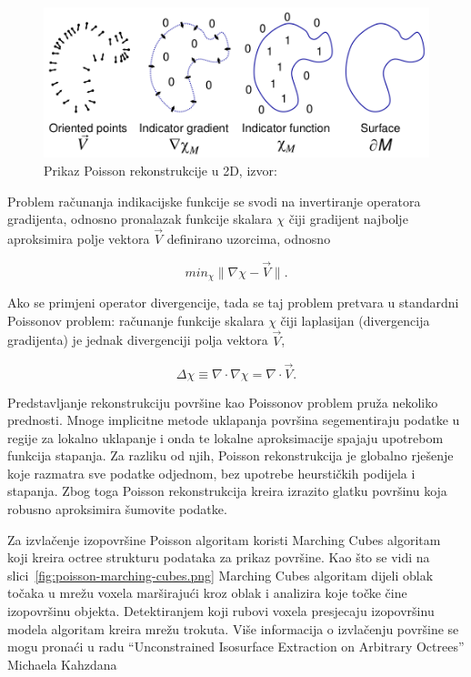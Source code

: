 \begin{figure}[h]
\centering
\includegraphics[scale=0.35]{figures/poisson-reconstruction.png}
\caption[]{Prikaz Poisson rekonstrukcije u 2D,
    izvor:~\cite{Kazhdan:2006}}
\label{fig:poisson-reconstruction.png}
\end{figure}

Problem računanja indikacijske funkcije se svodi na invertiranje
operatora gradijenta, odnosno pronalazak funkcije skalara \(\chi\) čiji
gradijent najbolje aproksimira polje vektora \(\vec{V}\) definirano
uzorcima, odnosno 

\begin{equation*}
min_\chi \|\nabla\chi - \vec{V}\|.
\end{equation*}

Ako se primjeni operator divergencije, tada se taj problem pretvara u
standardni Poissonov problem: računanje funkcije skalara \(\chi\) čiji
laplasijan (divergencija gradijenta) je jednak divergenciji polja
vektora \(\vec{V}\),

\begin{equation*}
\Delta \chi \equiv \nabla \cdot \nabla\chi = \nabla \cdot \vec{V}.
\end{equation*}

Predstavljanje rekonstrukciju površine kao Poissonov problem pruža
nekoliko prednosti. Mnoge implicitne metode uklapanja površina
segementiraju podatke u regije za lokalno uklapanje i onda te lokalne
aproksimacije spajaju upotrebom funkcija stapanja. Za razliku od njih,
Poisson rekonstrukcija je globalno rješenje koje razmatra sve podatke
odjednom, bez upotrebe heurstičkih podijela i stapanja. Zbog toga
Poisson rekonstrukcija kreira izrazito glatku površinu koja robusno
aproksimira šumovite podatke.  

Za izvlačenje izopovršine Poisson algoritam koristi Marching Cubes
algoritam~\cite{Lorensen87marchingcubes} koji kreira octree strukturu
podataka za prikaz površine.  Kao što se vidi na
slici~\ref{fig:poisson-marching-cubes.png} Marching Cubes algoritam
dijeli oblak točaka u mrežu voxela marširajući kroz oblak i analizira
koje točke čine izopovršinu objekta.  Detektiranjem koji rubovi voxela
presjecaju izopovršinu modela algoritam kreira mrežu trokuta. Više
informacija o izvlačenju površine se mogu pronaći u radu “Unconstrained
Isosurface Extraction on Arbitrary Octrees” Michaela
Kahzdana~\cite{Kazhdan:2007}

